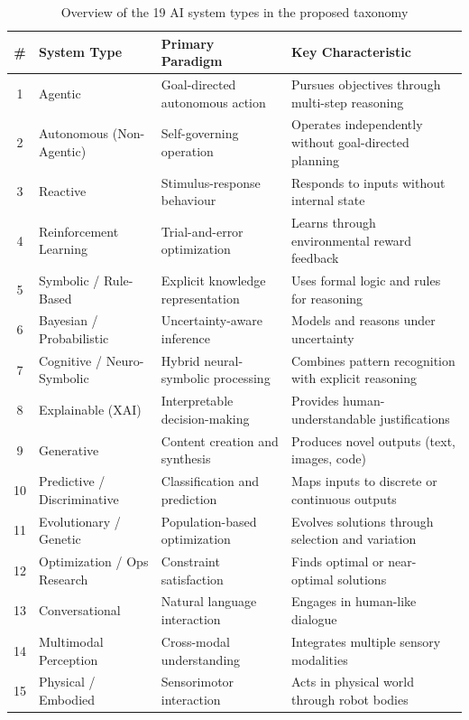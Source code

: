 \documentclass[acmsmall,screen,review]{acmart}
\begin{document}
\begin{table}[ht]
  \caption{Overview of the 19 AI system types in the proposed taxonomy}
  \label{tab:taxonomy-overview}
  \small
  \begin{tabular}{c p{3.5cm} p{4cm} p{5.5cm}}
    \toprule
    \textbf{\#} & \textbf{System Type} & \textbf{Primary Paradigm} & \textbf{Key Characteristic} \\
    \midrule
    1 & Agentic & Goal-directed autonomous action & Pursues objectives through multi-step reasoning \\
    2 & Autonomous (Non-Agentic) & Self-governing operation & Operates independently without goal-directed planning \\
    3 & Reactive & Stimulus-response behaviour & Responds to inputs without internal state \\
    4 & Reinforcement Learning & Trial-and-error optimization & Learns through environmental reward feedback \\
    5 & Symbolic / Rule-Based & Explicit knowledge representation & Uses formal logic and rules for reasoning \\
    6 & Bayesian / Probabilistic & Uncertainty-aware inference & Models and reasons under uncertainty \\
    7 & Cognitive / Neuro-Symbolic & Hybrid neural-symbolic processing & Combines pattern recognition with explicit reasoning \\
    8 & Explainable (XAI) & Interpretable decision-making & Provides human-understandable justifications \\
    9 & Generative & Content creation and synthesis & Produces novel outputs (text, images, code) \\
    10 & Predictive / Discriminative & Classification and prediction & Maps inputs to discrete or continuous outputs \\
    11 & Evolutionary / Genetic & Population-based optimization & Evolves solutions through selection and variation \\
    12 & Optimization / Ops Research & Constraint satisfaction & Finds optimal or near-optimal solutions \\
    13 & Conversational & Natural language interaction & Engages in human-like dialogue \\
    14 & Multimodal Perception & Cross-modal understanding & Integrates multiple sensory modalities \\
    15 & Physical / Embodied & Sensorimotor interaction & Acts in physical world through robot bodies \\

\end{tabular}
\end{table}
\end{document}
